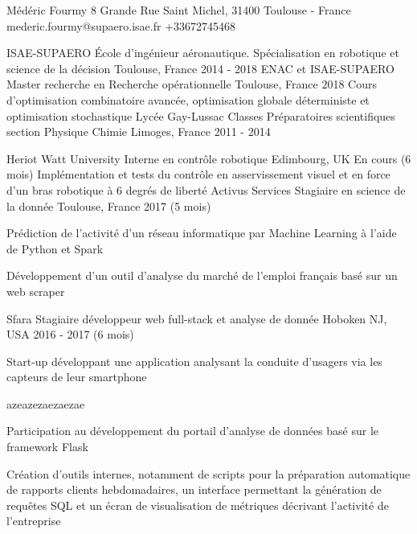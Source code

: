 \documentclass[11pt, a4paper, final]{resume}
\begin{document}
	\header
		{Médéric}
		{Fourmy}
		{8 Grande Rue Saint Michel, 31400 Toulouse - France}
		{mederic.fourmy@supaero.isae.fr}
		{+33672745468}
		{}
		{}


	\begin{cventries}
		\cventry
		{ISAE-SUPAERO}
		{École d'ingénieur aéronautique. Spécialisation en robotique et science de la décision}
		{Toulouse, France}
		{2014 - 2018}
		{}
		\cventry
		{ENAC et ISAE-SUPAERO}
		{Master recherche en Recherche opérationnelle}
		{Toulouse, France}
		{2018}
		{Cours d'optimisation combinatoire avancée, optimisation globale déterministe et optimisation stochastique}
		\cventry
		{Lycée Gay-Lussac}
		{Classes Préparatoires scientifiques section Physique Chimie}
		{Limoges, France}
		{2011 - 2014}
		{}
	\end{cventries}

	\cvsection{Expérience professionnelle}
	\begin{cventries}
		\cventry
		{Heriot Watt University}
		{Interne en contrôle robotique}
		{Edimbourg, UK}
		{En cours (6 mois)}
		{
			Implémentation et tests du contrôle en asservissement visuel et en force d'un bras robotique à 6 degrés de liberté
		}
		\cventry
		{Activus Services}
		{Stagiaire en science de la donnée}
		{Toulouse, France}
		{2017 (5 mois)}
		{
			\begin{cvitems}{}
				\item Prédiction de l'activité d'un réseau informatique par Machine Learning à l'aide de Python et Spark
				\item Développement d'un outil d'analyse du marché de l'emploi français basé sur un web scraper
			\end{cvitems}
		}
		\cventry
		{Sfara}
		{Stagiaire développeur web full-stack et analyse de donnée}
		{Hoboken NJ, USA}
		{2016 - 2017 (6 mois)}
		{
			Start-up développant une application analysant la conduite d'usagers via les capteurs de leur smartphone
			\begin{cvitems}{azeazezaezaezae}
				\item Participation au développement du portail d'analyse de données basé sur le framework Flask
				\item Création d'outils internes, notamment de scripts pour la préparation automatique de rapports clients hebdomadaires, un interface permettant la génération de requêtes SQL et un écran de visualisation de métriques décrivant l'activité de l'entreprise
			\end{cvitems}
		}
	\end{cventries}
\end{document}

